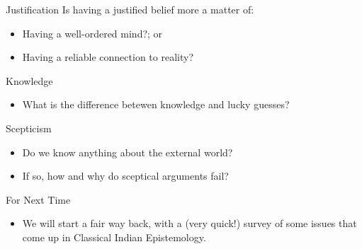 \documentclass[
  17pt,
  letterpaper,
  ignorenonframetext,
  aspectratio=169,
  handout]{beamer}
\providecommand{\tightlist}{%
  \setlength{\itemsep}{0pt}\setlength{\parskip}{0pt}}\usepackage{longtable,booktabs,array}
\begin{document}
\begin{frame}{Justification}
\protect\hypertarget{justification}{}
Is having a justified belief more a matter of:

\begin{itemize}[<+->]
\tightlist
\item
  Having a well-ordered mind?; or
\item
  Having a reliable connection to reality?
\end{itemize}
\end{frame}

\begin{frame}{Knowledge}
\protect\hypertarget{knowledge}{}
\begin{itemize}[<+->]
\tightlist
\item
  What is the difference betewen knowledge and lucky guesses?
\end{itemize}
\end{frame}

\begin{frame}{Scepticism}
\protect\hypertarget{scepticism}{}
\begin{itemize}[<+->]
\tightlist
\item
  Do we know anything about the external world?
\item
  If so, how and why do sceptical arguments fail?
\end{itemize}
\end{frame}

\begin{frame}{For Next Time}
\protect\hypertarget{for-next-time}{}
\begin{itemize}[<+->]
\tightlist
\item
  We will start a fair way back, with a (very quick!) survey of some
  issues that come up in Classical Indian Epistemology.
\end{itemize}
\end{frame}
\end{document}
